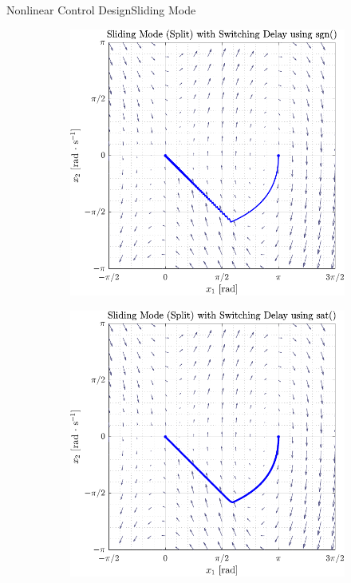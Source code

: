 \begin{frame}{Nonlinear Control Design}{Sliding Mode}
\begin{figure}[H]
  \begin{minipage}{0.45\linewidth}
    \begin{figure}[H]
      \centering
      \includegraphics[width=\linewidth]{figures/slidingModeSplitSgn}
    \end{figure}        
  \end{minipage}\hfill      
  \begin{minipage}{0.45\linewidth}
    \begin{figure}[H]
      \centering
      \includegraphics[width=1\linewidth]{figures/slidingModeSplitSat}

\end{figure}
\end{minipage}
\end{figure}
\end{frame}
